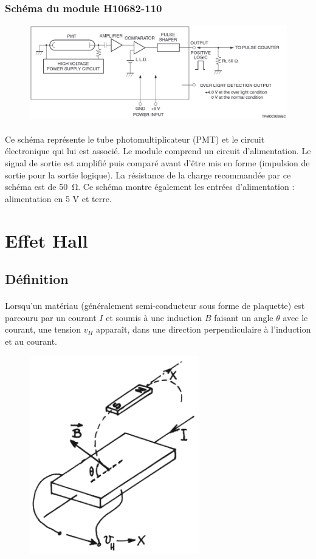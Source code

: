 \documentclass{article}
\begin{document}
    \subsubsection{Schéma du module H10682-110}
    \begin{figure}[H]
        \centering
        \includegraphics[width=0.8\linewidth]{./images/H10682-block-diagram.png}
    \end{figure}

    \paragraph{}
    Ce schéma représente le tube photomultiplicateur (PMT) et le circuit électronique qui lui est associé. Le module comprend un circuit d'alimentation. Le signal de sortie est amplifié puis comparé avant d'être mis en forme (impulsion de sortie pour la sortie logique). La résistance de la charge recommandée par ce schéma est de \SI{50}{\ohm}. Ce schéma montre également les entrées d'alimentation : alimentation en 5 V et terre.


    \newpage
    \section{Effet Hall}

    \subsection{Définition}
    \paragraph{}
    Lorsqu'un matériau (généralement semi-conducteur sous forme de plaquette) est parcouru par un courant $I$ et soumis à une induction $B$ faisant un angle $\theta$ avec le courant, une tension $v_H$ apparaît, dans une direction perpendiculaire à l'induction et au courant.
        
    \begin{figure}[H]
        \centering
        \includegraphics[width=0.3\linewidth]{./images/effet-hall.png}
    \end{figure}
            
\end{document}
